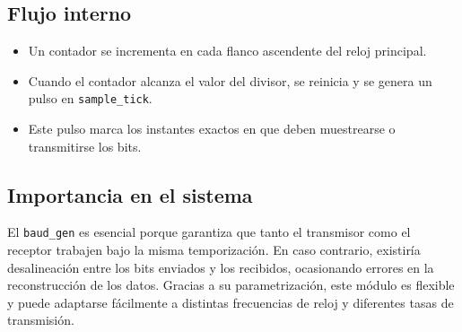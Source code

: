 \subsection{Flujo interno}
\begin{itemize}
    \item Un contador se incrementa en cada flanco ascendente del reloj principal.
    \item Cuando el contador alcanza el valor del divisor, se reinicia y se genera un pulso en \texttt{sample\_tick}.
    \item Este pulso marca los instantes exactos en que deben muestrearse o transmitirse los bits.
\end{itemize}

\subsection{Importancia en el sistema}
El \texttt{baud\_gen} es esencial porque garantiza que tanto el transmisor como el receptor trabajen bajo la misma temporización. 
En caso contrario, existiría desalineación entre los bits enviados y los recibidos, ocasionando errores en la reconstrucción de los datos.  
Gracias a su parametrización, este módulo es flexible y puede adaptarse fácilmente a distintas frecuencias de reloj y diferentes tasas de transmisión.
